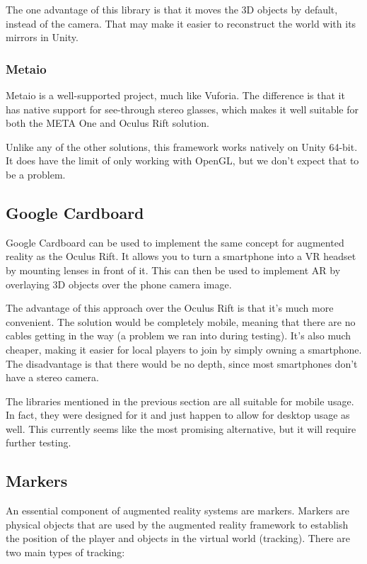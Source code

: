 				The one advantage of this library is that it moves the 3D
				objects by default, instead of the camera. That may make it
				easier to reconstruct the world with its mirrors in Unity.

			\subsubsection{Metaio} \label{sssec:metaio}
				Metaio is a well-supported project, much like Vuforia. The
				difference is that it has native support for see-through stereo
				glasses, which makes it well suitable for both the META One and
				Oculus Rift solution. \cite{metaio}

				Unlike any of the other solutions, this framework works
				natively on Unity 64-bit. It does have the limit of only working
				with OpenGL, but we don't expect that to be a problem.

		\subsection{Google Cardboard} \label{ssec:cardboard}
			Google Cardboard can be used to implement the same concept for
			augmented reality as the Oculus Rift. It allows you to turn a
			smartphone into a VR headset by mounting lenses in front of it. This
			can then be used to implement AR by overlaying 3D objects over the
			phone camera image. \cite{cardboard}

			The advantage of this approach over the Oculus Rift is that it's
			much more convenient. The solution would be completely mobile,
			meaning that there are no cables getting in the way (a problem we
			ran into during testing). It's also much cheaper, making it easier
			for local players to join by simply owning a smartphone. The
			disadvantage is that there would be no depth, since most smartphones
			don't have a stereo camera.

			The libraries mentioned in the previous section are all suitable for
			mobile usage. In fact, they were designed for it and just happen to
			allow for desktop usage as well. This currently seems like the most
			promising alternative, but it will require further testing.

		\subsection{Markers} \label{ssec:markers}
			An essential component of augmented reality systems are markers.
			Markers are physical objects that are used by the augmented reality
			framework to establish the position of the player and objects in the
			virtual world (tracking). There are two main types of tracking:

